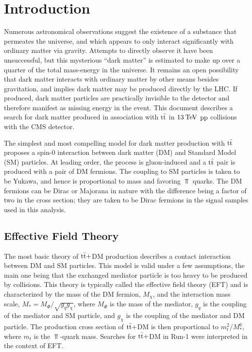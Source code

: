 \section{Introduction}
\label{sec:introduction}

Numerous astronomical observations suggest the existence of a substance that permeates the universe, and which appears to only interact significantly with ordinary matter via gravity. Attempts to directly observe it have been unsuccessful, but this mysterious ``dark matter'' is estimated to make up over a quarter of the total mass-energy in the universe. It remains an open possibility that dark matter interacts with ordinary matter by other means besides gravitation, and implies dark matter may be produced directly by the LHC. If produced, dark matter particles are practically invisible to the detector and therefore manifest as missing energy in the event. This document describes a search for dark matter produced in association with $\mathrm{t}\bar{\mathrm{t}}$ in $13\:\mathrm{Te\kern -0.1em V}$ $\mathrm{p}\mathrm{p}$ collisions with the CMS detector.

The simplest and most compelling model for dark matter production with $\mathrm{t}\bar{\mathrm{t}}$ proposes a spin-$0$ interaction between dark matter (DM) and Standard Model (SM) particles. At leading order, the process is gluon-induced and a $\mathrm{t}\bar{\mathrm{t}}$ pair is produced with a pair of DM fermions. The coupling to SM particles is taken to be Yukawa, and hence is proportional to mass and favoring $\Top$ quarks. The DM fermions can be Dirac or Majorana in nature with the difference being a factor of two in the cross section; they are taken to be Dirac fermions in the signal samples used in this analysis.

\subsection{Effective Field Theory}
\label{subsec:intro_eft}
The most basic theory of $\mathrm{t}\bar{\mathrm{t}}+$DM production describes a contact interaction between DM and SM particles. This model is valid under a few assumptions, the main one being that the exchanged mediator particle is too heavy to be produced by collisions. This theory is typically called the effective field theory (EFT) and is characterized by the mass of the DM fermion, $M_\chi$, and the interaction mass scale, $M_{*} = M_{\Phi}/\sqrt{g_q g_\chi}$, where $M_{\Phi}$ is the mass of the mediator, $g_q$ is the coupling of the mediator and SM particle, and $g_\chi$ is the coupling of the mediator and DM particle. The production cross section of $\mathrm{t}\bar{\mathrm{t}}+$DM is then proportional to $m_t^2/M_*^6$, where $m_t$ is the $\Top$-quark mass. Searches for $\mathrm{t}\bar{\mathrm{t}}+$DM in Run-1 were interpreted in the context of EFT.

